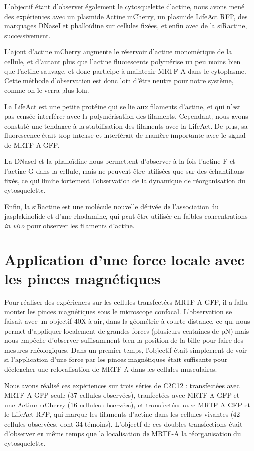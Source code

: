 \documentclass{report}
\begin{document}
L'objectif étant d'observer également le cytosquelette d'actine, nous avons mené des expériences avec un plasmide Actine mCherry, un plasmide LifeAct RFP, des marquages DNaseI et phalloïdine sur cellules fixées, et enfin avec de la siRactine, successivement.
 
L'ajout d'actine mCherry augmente le réservoir d'actine monomérique de la cellule, et d'autant plus que l'actine fluorescente polymérise un peu moins bien que l'actine sauvage, et donc participe à maintenir MRTF-A dans le cytoplasme. 
Cette méthode d'observation est donc loin d'être neutre pour notre système, comme on le verra plus loin.
 
La LifeAct est une petite protéine qui se lie aux filaments d'actine, et qui n'est pas censée interférer avec la polymérisation des filaments. Cependant, nous avons constaté une tendance à la stabilisation des filaments avec la LifeAct. De plus, sa fluorescence était trop intense et interférait de manière importante avec le signal de MRTF-A GFP. 

La DNaseI et la phalloïdine nous permettent d'observer à la fois l'actine F et l'actine G dans la cellule, mais ne peuvent être utilisées que sur des échantillons fixés, ce qui limite fortement l'observation de la dynamique de réorganisation du cytosquelette.
 
Enfin, la siRactine est une molécule nouvelle dérivée de l'association du jasplakinolide et d'une rhodamine, qui peut être utilisée en faibles concentrations \emph{in vivo} pour observer les filaments d'actine. 


\section{Application d'une force locale avec les pinces magnétiques}

Pour réaliser des expériences sur les cellules transfectées MRTF-A GFP, il a fallu monter les pinces magnétiques sous le microscope confocal. 
L'observation se faisait avec un objectif 40X à air, dans la géométrie à courte distance, ce qui nous permet d'appliquer localement de grandes forces (plusieurs centaines de pN) mais nous empêche d'observer suffisamment bien la position de la bille pour faire des mesures rhéologiques. 
Dans un premier temps, l'objectif était simplement de voir si l'application d'une force par les pinces magnétiques était suffisante pour déclencher une relocalisation de MRTF-A dans les cellules musculaires. 

Nous avons réalisé ces expériences sur trois séries de C2C12 : transfectées avec MRTF-A GFP seule (37 cellules observées), tranfectées avec MRTF-A GFP et une Actine mCherry (16 cellules observées), et transfectées avec MRTF-A GFP et le LifeAct RFP, qui marque les filaments d'actine dans les cellules vivantes (42 cellules observées, dont 34 témoins). 
L'objectf de ces doubles transfections était d'observer en même temps que la localisation de MRTF-A la réorganisation du cytosquelette. 
\end{document}
